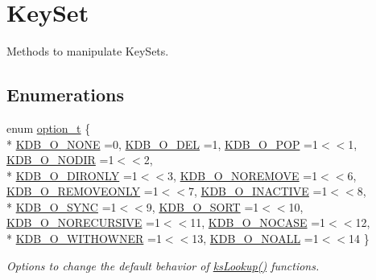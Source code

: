 \hypertarget{group__keyset}{\section{Key\+Set}
\label{group__keyset}
}


Methods to manipulate Key\+Sets.  


\subsection*{Enumerations}
\begin{DoxyCompactItemize}
\item 
enum \hyperlink{group__keyset_ga98a3d6a4016c9dad9cbd1a99a9c2a45a}{option\+\_\+t} \{ \\*
\hyperlink{group__keyset_gga98a3d6a4016c9dad9cbd1a99a9c2a45aa00738455e0ae843c8720809d8287f370}{K\+D\+B\+\_\+\+O\+\_\+\+N\+O\+N\+E} =0, 
\hyperlink{group__keyset_gga98a3d6a4016c9dad9cbd1a99a9c2a45aa66a5380c120f25f28f49848c4a863ead}{K\+D\+B\+\_\+\+O\+\_\+\+D\+E\+L} =1, 
\hyperlink{group__keyset_gga98a3d6a4016c9dad9cbd1a99a9c2a45aa52fb5f2cc86773d393da62bebebf7984}{K\+D\+B\+\_\+\+O\+\_\+\+P\+O\+P} =1$<$$<$1, 
\hyperlink{group__keyset_gga98a3d6a4016c9dad9cbd1a99a9c2a45aa1a70738b2126badb8db7b012c8a1c610}{K\+D\+B\+\_\+\+O\+\_\+\+N\+O\+D\+I\+R} =1$<$$<$2, 
\\*
\hyperlink{group__keyset_gga98a3d6a4016c9dad9cbd1a99a9c2a45aa131e99d60253d0b887a1e5886f8aa96c}{K\+D\+B\+\_\+\+O\+\_\+\+D\+I\+R\+O\+N\+L\+Y} =1$<$$<$3, 
\hyperlink{group__keyset_gga98a3d6a4016c9dad9cbd1a99a9c2a45aa7649f575c2eb0adeaf2c9173ae16e0e6}{K\+D\+B\+\_\+\+O\+\_\+\+N\+O\+R\+E\+M\+O\+V\+E} =1$<$$<$6, 
\hyperlink{group__keyset_gga98a3d6a4016c9dad9cbd1a99a9c2a45aaf6ed09cee8aa8cf0d6a0e318a7105440}{K\+D\+B\+\_\+\+O\+\_\+\+R\+E\+M\+O\+V\+E\+O\+N\+L\+Y} =1$<$$<$7, 
\hyperlink{group__keyset_gga98a3d6a4016c9dad9cbd1a99a9c2a45aa789926d8a8e15b029cf7dded4154bcda}{K\+D\+B\+\_\+\+O\+\_\+\+I\+N\+A\+C\+T\+I\+V\+E} =1$<$$<$8, 
\\*
\hyperlink{group__keyset_gga98a3d6a4016c9dad9cbd1a99a9c2a45aaa7d5265eacbb1590982b718f35443e2e}{K\+D\+B\+\_\+\+O\+\_\+\+S\+Y\+N\+C} =1$<$$<$9, 
\hyperlink{group__keyset_gga98a3d6a4016c9dad9cbd1a99a9c2a45aad9d03b36ee88ca5a774cc01b190c99b8}{K\+D\+B\+\_\+\+O\+\_\+\+S\+O\+R\+T} =1$<$$<$10, 
\hyperlink{group__keyset_gga98a3d6a4016c9dad9cbd1a99a9c2a45aa6adaa17b267027ce50e670bf8cc6e824}{K\+D\+B\+\_\+\+O\+\_\+\+N\+O\+R\+E\+C\+U\+R\+S\+I\+V\+E} =1$<$$<$11, 
\hyperlink{group__keyset_gga98a3d6a4016c9dad9cbd1a99a9c2a45aaa5586d229e048f816bf7982765442b86}{K\+D\+B\+\_\+\+O\+\_\+\+N\+O\+C\+A\+S\+E} =1$<$$<$12, 
\\*
\hyperlink{group__keyset_gga98a3d6a4016c9dad9cbd1a99a9c2a45aab2ff402f5de9aa67b7f786fb715a7a31}{K\+D\+B\+\_\+\+O\+\_\+\+W\+I\+T\+H\+O\+W\+N\+E\+R} =1$<$$<$13, 
\hyperlink{group__keyset_gga98a3d6a4016c9dad9cbd1a99a9c2a45aae8dd1961707e7d0c27228a3f98b0a94d}{K\+D\+B\+\_\+\+O\+\_\+\+N\+O\+A\+L\+L} =1$<$$<$14
 \}
\begin{DoxyCompactList}\small\item\em Options to change the default behavior of \hyperlink{group__keyset_gaa34fc43a081e6b01e4120daa6c112004}{ks\+Lookup()} functions. \end{DoxyCompactList}\end{DoxyCompactItemize}
